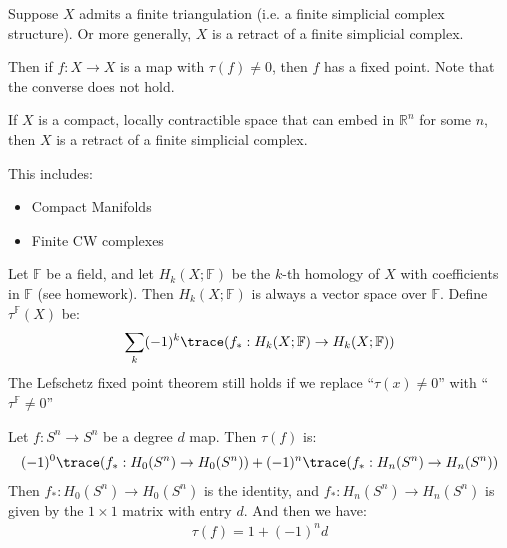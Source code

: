 \begin{theorem}\label{thm-lefschetz-fixed-point}
	Suppose $X$ admits a finite triangulation (i.e. a finite simplicial complex structure). Or more generally, $X$ is a retract of a finite simplicial complex.

	Then if $f :X \to X$ is a map with $\tau(f) \neq 0$, then $f$ has a fixed point. Note that the converse does not hold.
\end{theorem}

\begin{theorem}\label{thm-retract-simplicial-complex}
	If $X$ is a compact, locally contractible space that can embed in $\mathbb{R}^n$ for some $n$, then $X$ is a retract of a finite simplicial complex.

	This includes:
	\begin{itemize}
		\item Compact Manifolds
		\item Finite CW complexes
	\end{itemize}
\end{theorem}

\begin{definition}\label{def:lefschetz-number-better}
	Let $\mathbb{F}$ be a field, and let $H_k(X; \mathbb{F})$ be the $k$-th homology of $X$ with coefficients in $\mathbb{F}$ (see homework).
	Then $H_k(X; \mathbb{F})$ is always a vector space over $\mathbb{F}$. Define $\tau^{\mathbb{F}}(X)$ be:
	\begin{align*}
		\sum_k (-1)^k \trace(f_\ast : H_k(X; \mathbb{F}) \to H_k(X; \mathbb{F}))
	\end{align*}
	The Lefschetz fixed point theorem still holds if we replace ``$\tau(x) \neq 0$'' with ``$\tau^{\mathbb{F}} \neq 0$''
\end{definition}

\begin{eg}
	Let $f : S^n \to S^n$ be a degree $d$ map. Then $\tau(f)$ is:
	\begin{align*}
		(-1)^0\trace(f_\ast : H_0(S^n) \to H_0(S^n)) + (-1)^n\trace(f_\ast : H_n(S^n) \to H_n(S^n))
	\end{align*}
	Then $f_\ast : H_0(S^n) \to H_0(S^n)$ is the identity, and $f_\ast : H_n(S^n) \to H_n(S^n)$ is given by the $1 \times 1$ matrix with entry $d$. And then we have:
	\begin{align*}
		\tau(f) = 1 + (-1)^n d
	\end{align*}
\end{eg}

